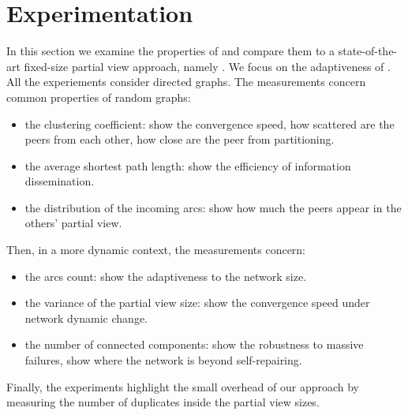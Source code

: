\section{Experimentation}
\label{sec:experiments}

In this section we examine the properties of \SPRAY and compare them to a
state-of-the-art fixed-size partial view approach, namely \CYCLON. We focus on
the adaptiveness of \SPRAY. All the experiements consider directed graphs. The
measurements concern common properties of random graphs:
\begin{itemize}
\item the clustering coefficient: show the convergence speed, how scattered
  are the peers from each other, how close are the peer from partitioning.
\item the average shortest path length: show the efficiency of information
  dissemination.
\item the distribution of the incoming arcs: show how much the peers appear
  in the others' partial view.
\end{itemize}
Then, in a more dynamic context, the measurements concern:
\begin{itemize}
\item the arcs count: show the adaptiveness to the network size.
\item the variance of the partial view size: show the convergence speed under
  network dynamic change.
\item the number of connected components: show the robustness to massive
  failures, show where the network is beyond self-repairing.
\end{itemize}
Finally, the experiments highlight the small overhead of our approach by
measuring the number of duplicates inside the partial view sizes.

